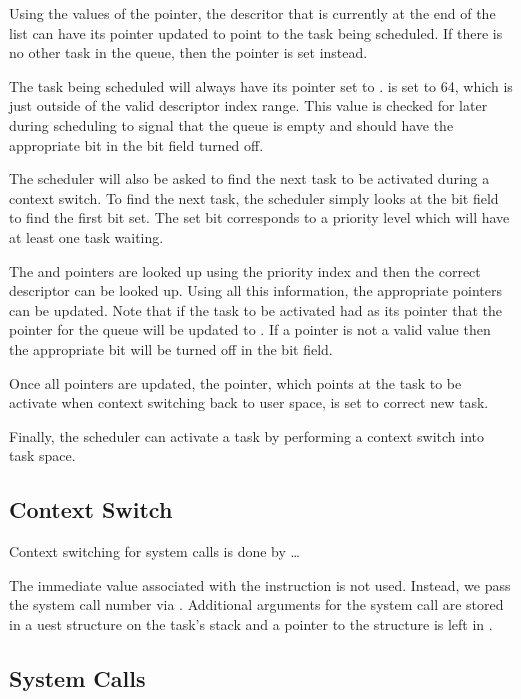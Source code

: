 \documentclass[pdftex,10pt,a4paper]{article}
\begin{document}
Using the values of the  pointer, the descritor that is
currently at the end of the list can have its  pointer
updated to point to the task being scheduled. If there is no other
task in the queue, then the  pointer is set instead.

The task being scheduled will always have its  pointer set
to .  is set to 64, which is just
outside of the valid descriptor index range. This value is checked for
later during scheduling to signal that the queue is empty and should
have the appropriate bit in the bit field turned off.

The scheduler will also be asked to find the next task to be
activated during a context switch. To find the next task, the
scheduler simply looks at the bit field to find the first bit set. The
set bit corresponds to a priority level which will have at least one
task waiting.

The  and  pointers are looked up using the
priority index and then the correct descriptor can be looked up. Using
all this information, the appropriate pointers can be updated. Note
that if the task to be activated had  as its 
pointer that the  pointer for the queue will be updated to
. If a  pointer is not a valid value then the
appropriate bit will be turned off in the bit field.

Once all pointers are updated, the  pointer, which
points at the task to be activate when context switching back to user
space, is set to correct new task.

Finally, the scheduler can activate a task by performing a context
switch into task space.

\subsection*{Context Switch}

Context switching for system calls is done by \ldots

The immediate value associated with the  instruction is not
used. Instead, we pass the system call number via . Additional
arguments for the system call are stored in a uest
structure on the task's stack and a pointer to the structure is left
in .

\subsection*{System Calls}
\end{document}
